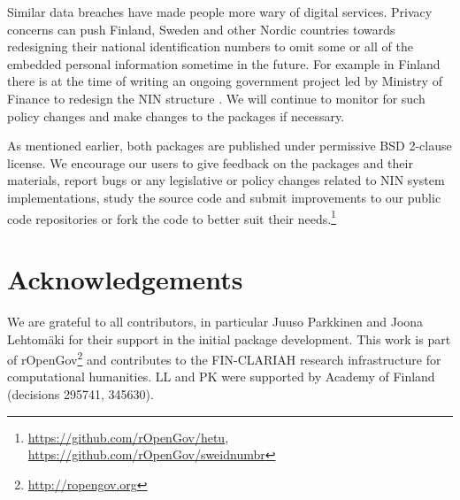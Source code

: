 Similar data breaches have made people more wary of digital services. Privacy concerns can push Finland, Sweden and other Nordic countries towards redesigning their national identification numbers to omit some or all of the embedded personal information sometime in the future. For example in Finland there is at the time of writing an ongoing government project led by Ministry of Finance to redesign the NIN structure \citep{valtiovarainministerio2022}. We will continue to monitor for such policy changes and make changes to the packages if necessary.

As mentioned earlier, both packages are published under permissive BSD 2-clause license. We encourage our users to give feedback on the packages and their materials, report bugs or any legislative or policy changes related to NIN system implementations, study the source code and submit improvements to our public code repositories or fork the code to better suit their needs.\footnote{\url{https://github.com/rOpenGov/hetu}, \url{https://github.com/rOpenGov/sweidnumbr}}

\section{Acknowledgements}

We are grateful to all contributors, in particular Juuso Parkkinen and Joona Lehtomäki for their support in the initial package development. This work is part of rOpenGov\footnote{\url{http://ropengov.org}} and contributes to the FIN-CLARIAH research infrastructure for computational humanities. LL and PK were supported by Academy of Finland (decisions 295741, 345630).



\address{Pyry Kantanen\\
  Department of Computing\\
  PO Box 20014 University of Turku\\
  Finland\\
  ORCiD: 0000-0003-2853-2765\\
  }
  
\address{Erik Bülow\\
  Department of Orthopaedics, Institute of clinical sciences\\
  Sahlgrenska Academy\\ University of Gothenburg\\
  Sweden\\
  ORCiD: 0000-0002-9973-456X\\
  }
  
